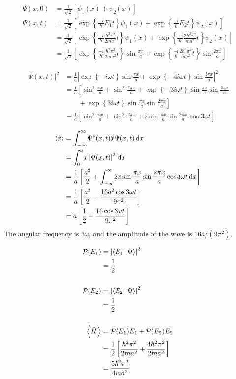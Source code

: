 \documentclass[12pt]{article}
\begin{document}
\newpage
\problemasub
\newcommand{\eigexp}[1]{\exp\left\{\frac{-i}{\hbar}#1t\right\}}
\newcommand{\absq}[1]{\left|#1\right|^2}
\begin{align*}
\Psi(x, 0) &= \frac{1}{\sqrt{2}}[\psi_1(x) + \psi_2(x)] \\
\Psi(x, t) &= \frac{1}{\sqrt{2}}\left[\eigexp{E_1}\psi_1(x)+\eigexp{E_2}\psi_2(x)\right] \\
&= \frac{1}{\sqrt{2}}\left[\eigexp{\frac{\hbar^2\pi^2}{2ma^2}}\psi_1(x)+\eigexp{\frac{2\hbar^2\pi^2}{ma^2}}\psi_2(x)\right] \\
&= \frac{1}{\sqrt{a}}\left[\eigexp{\frac{\hbar^2\pi^2}{2ma^2}}\sin{\frac{\pi x}{a}}+\eigexp{\frac{2\hbar^2\pi^2}{ma^2}}\sin{\frac{2\pi x}{a}}\right]
\end{align*}

\renewcommand{\eigexp}[1]{\exp\left\{#1t\right\}}
\begin{align*}
\absq{\Psi(x,t)} &= \frac{1}{a}\absq{\eigexp{-i\omega}\sin{\frac{\pi x}{a}}+\eigexp{-4i\omega}\sin{\frac{2\pi x}{a}}}
\\
&= \frac{1}{a}\left[\sin^2{\frac{\pi x}{a}}+\sin^2{\frac{2\pi x}{a}} +
\eigexp{-3i\omega}\sin{\frac{\pi x}{a}}\sin{\frac{2\pi x}{a}} \right.\\
&\left.\qquad+\eigexp{3i\omega}\sin{\frac{\pi x}{a}}\sin{\frac{2\pi x}{a}}\right]
\\
&= \frac{1}{a}\left[\sin^2{\frac{\pi x}{a}}+\sin^2{\frac{2\pi x}{a}} +
2\sin{\frac{\pi x}{a}}\sin{\frac{2\pi x}{a}}\cos{3\omega t}\right]
\end{align*}

\problemasub
\begin{align*}
\Braket{\hat{x}} &= \int_{-\infty}^{\infty}\! \Psi^*(x,t) \hat{x} \Psi(x,t) \, \d x \\
&= \int_{0}^{a}\! x\absq{\Psi(x,t)} \, \d x \\
&= \frac{1}{a}\left[\frac{a^2}{2}+ \int_{-\infty}^{\infty}\! 2x\sin{\frac{\pi x}{a}}\sin{\frac{2\pi x}{a}}\cos{3\omega t} \,\d x \right] \\
&= \frac{1}{a}\left[\frac{a^2}{2} - \frac{16a^2\cos{3\omega t}}{9\pi^2} \right] \\
&= a\left[\frac{1}{2} - \frac{16\cos{3\omega t}}{9\pi^2} \right]
\end{align*}
The angular frequency is $3\omega$, and the amplitude of the wave is $16a/(9\pi^2)$.

\newpage
\problemasub
\begin{align*}
\mathcal{P}(E_1) &= \absq{\Braket{E_1|\Psi}} \\
&= \frac{1}{2} \\
\\
\mathcal{P}(E_2) &= \absq{\Braket{E_2|\Psi}} \\
&= \frac{1}{2} \\
\\
\Braket{\hat{H}} &= \mathcal{P}(E_1)E_1 + \mathcal{P}(E_2)E_2 \\
&= \frac{1}{2}\left[\frac{\hbar^2\pi^2}{2ma^2}+\frac{4\hbar^2\pi^2}{2ma^2}\right] \\
&= \frac{5\hbar^2\pi^2}{4ma^2}
\end{align*}
\end{document}
